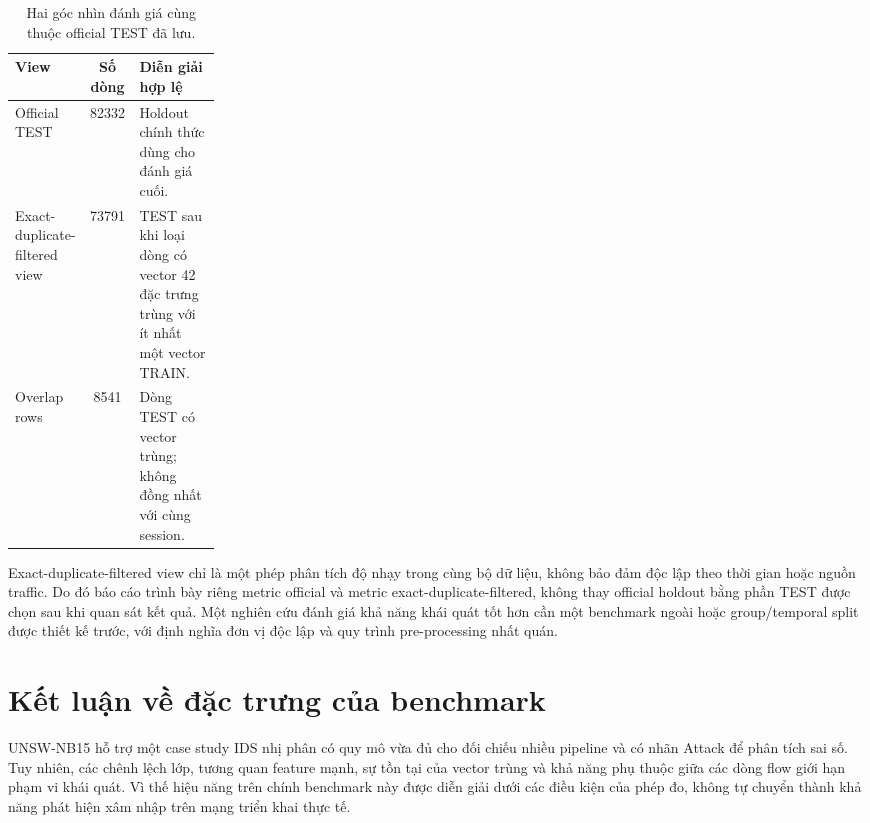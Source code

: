\begin{table}[htbp]
\centering\small
\renewcommand{\arraystretch}{1.3}
\setlength{\tabcolsep}{8pt}
\caption{Hai góc nhìn đánh giá cùng thuộc official TEST đã lưu.}
\label{tab:views-test}
\begin{tabularx}{\linewidth}{p{0.24\linewidth} S[table-format=5.0] X}\toprule
View & {Số dòng} & Diễn giải hợp lệ\\\midrule
Official TEST & 82332 & Holdout chính thức dùng cho đánh giá cuối.\\
Exact-duplicate-filtered view & 73791 & TEST sau khi loại dòng có vector 42 đặc trưng trùng với ít nhất một vector TRAIN.\\
Overlap rows & 8541 & Dòng TEST có vector trùng; không đồng nhất với cùng session.\\\bottomrule
\end{tabularx}
\end{table}

Exact-duplicate-filtered view chỉ là một phép phân tích độ nhạy trong cùng bộ dữ liệu, không bảo đảm độc lập theo thời gian hoặc nguồn traffic. Do đó báo cáo trình bày riêng metric official và metric exact-duplicate-filtered, không thay official holdout bằng phần TEST được chọn sau khi quan sát kết quả. Một nghiên cứu đánh giá khả năng khái quát tốt hơn cần một benchmark ngoài hoặc group/temporal split được thiết kế trước, với định nghĩa đơn vị độc lập và quy trình pre-processing nhất quán.

\section{Kết luận về đặc trưng của benchmark}
UNSW-NB15 hỗ trợ một case study IDS nhị phân có quy mô vừa đủ cho đối chiếu nhiều pipeline và có nhãn Attack để phân tích sai số. Tuy nhiên, các chênh lệch lớp, tương quan feature mạnh, sự tồn tại của vector trùng và khả năng phụ thuộc giữa các dòng flow giới hạn phạm vi khái quát. Vì thế hiệu năng trên chính benchmark này được diễn giải dưới các điều kiện của phép đo, không tự chuyển thành khả năng phát hiện xâm nhập trên mạng triển khai thực tế.
